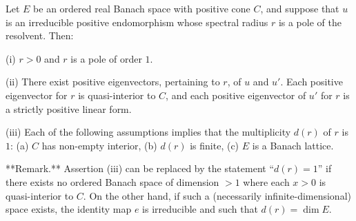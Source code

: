 Let $E$ be an ordered real Banach space with positive cone $C$, and suppose that $u$ is an irreducible positive endomorphism whose spectral radius $r$ is a pole of the resolvent. Then:

(i) $r > 0$ and $r$ is a pole of order $1$.

(ii) There exist positive eigenvectors, pertaining to $r$, of $u$ and $u'$. Each positive eigenvector for $r$ is quasi-interior to $C$, and each positive eigenvector of $u'$ for $r$ is a strictly positive linear form.

(iii) Each of the following assumptions implies that the multiplicity $d(r)$ of $r$ is $1$:
\quad (a) $C$ has non-empty interior,
\quad (b) $d(r)$ is finite,
\quad (c) $E$ is a Banach lattice.

**Remark.** Assertion (iii) can be replaced by the statement ``$d(r) = 1$'' if there exists no ordered Banach space of dimension $> 1$ where each $x > 0$ is quasi-interior to $C$. On the other hand, if such a (necessarily infinite-dimensional) space exists, the identity map $e$ is irreducible and such that $d(r) = \dim E$.
